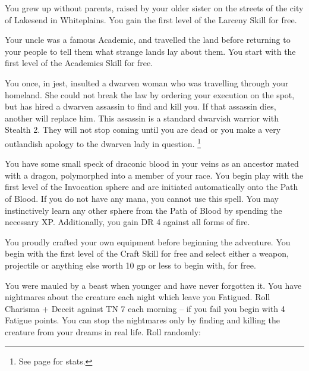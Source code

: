 \begin{multicols}{2}
\begin{list}{\addtocounter{list}{1}\textbf{:}}{\raggedleft}
	\item
	You grew up without parents, raised by your older sister on the streets of the city of Lakesend in Whiteplains.
	You gain the first level of the Larceny Skill for free.

	\item
	Your uncle was a famous Academic, and travelled the land before returning to your people to tell them what strange lands lay about them.
	You start with the first level of the Academics Skill for free.

	\item
	You once, in jest, insulted a dwarven woman who was travelling through your homeland.
	She could not break the law by ordering your execution on the spot, but has hired a dwarven assassin to find and kill you.
	If that assassin dies, another will replace him.
	This assassin is a standard dwarvish warrior with Stealth 2.
	They will not stop coming until you are dead or you make a very outlandish apology to the dwarven lady in question.
	\footnote{See page \pageref{dwarven_soldier} for stats.}

	\item
	You have some small speck of draconic blood in your veins as an ancestor mated with a dragon, polymorphed into a member of your race.
	You begin play with the first level of the Invocation sphere and are initiated automatically onto the Path of Blood.
	If you do not have any mana, you cannot use this spell.
	You may instinctively learn any other sphere from the Path of Blood by spending the necessary XP.
	Additionally, you gain DR 4 against all forms of fire.

	\item
	You proudly crafted your own equipment before beginning the adventure.
	You begin with the first level of the Craft Skill for free and select either a weapon, projectile or anything else worth 10 gp or less to begin with, for free.

	\item
	You were mauled by a beast when younger and have never forgotten it.
	You have nightmares about the creature each night which leave you Fatigued.
	Roll Charisma + Deceit against TN 7 each morning -- if you fail you begin with 4 Fatigue points.
	You can stop the nightmares only by finding and killing the creature from your dreams in real life.
	Roll randomly:

	\setcounter{enc}{6}

	\begin{list}{\addtocounter{enc}{-1}}{}


\end{list}
\end{list}
\end{multicols}
